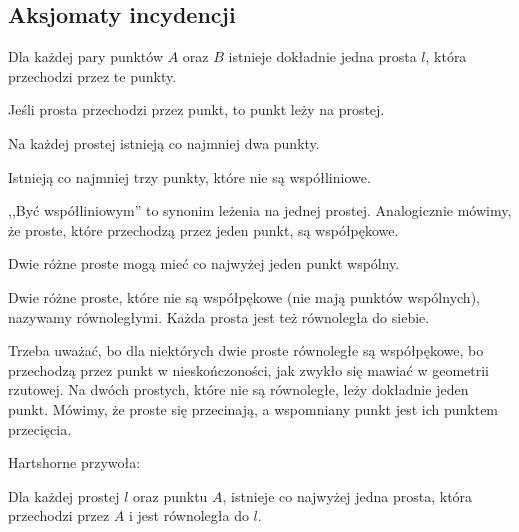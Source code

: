 %

\subsection{Aksjomaty incydencji}
\begin{axiom}[incydencji, I1]
    Dla każdej pary punktów $A$ oraz $B$ istnieje dokładnie jedna prosta $l$, która przechodzi przez te punkty.
\end{axiom}

Jeśli prosta przechodzi przez punkt, to punkt leży na prostej.

\begin{axiom}[incydencji, I2]
    Na każdej prostej istnieją co najmniej dwa punkty.
\end{axiom}

\begin{axiom}[incydencji, I3]
    Istnieją co najmniej trzy punkty, które nie są współliniowe.
\end{axiom}

,,Być współliniowym'' to synonim leżenia na jednej prostej.
%
Analogicznie mówimy, że proste, które przechodzą przez jeden punkt, są współpękowe.

\begin{proposition}
    Dwie różne proste mogą mieć co najwyżej jeden punkt wspólny.
\end{proposition}

\begin{definition}
    Dwie różne proste, które nie są współpękowe (nie mają punktów wspólnych), nazywamy równoległymi.
    Każda prosta jest też równoległa do siebie.
\end{definition}
%

Trzeba uważać, bo dla niektórych dwie proste równoległe są współpękowe, bo przechodzą przez punkt w nieskończoności, jak zwykło się mawiać w geometrii rzutowej.
Na dwóch prostych, które nie są równoległe, leży dokładnie jeden punkt.
Mówimy, że proste się przecinają, a wspomniany punkt jest ich punktem przecięcia.

Hartshorne \cite[s. 38]{hartshorne2000} przywoła:

\begin{axiom}[Playfaira, P]
    Dla każdej prostej $l$ oraz punktu $A$, istnieje co najwyżej jedna prosta, która przechodzi przez $A$ i jest równoległa do $l$.
\end{axiom}
%

